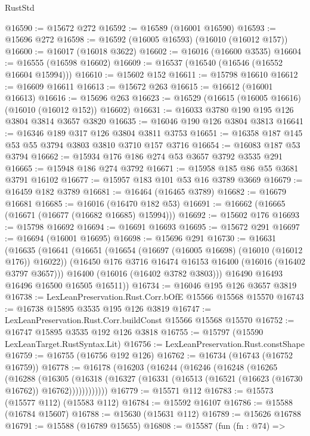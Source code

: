 \begin{lexlean}{RustStd}
\begin{coremodule}
@16590 := @15672 @272
@16592 := @16589 (@16001 @16590)
@16593 := @15696 @272
@16598 := @16592 (@16005 @16593) (@16010 (@16012 @157))
@16600 := @16017 (@16018 @3622)
@16602 := @16016 (@16600 @3535)
@16604 := @16555 (@16598 @16602)
@16609 := @16537 (@16540 (@16546 (@16552 @16604 @15994)))
@16610 := @15602 @152
@16611 := @15798 @16610
@16612 := @16609 @16611
@16613 := @15672 @263
@16615 := @16612 (@16001 @16613)
@16616 := @15696 @263
@16623 := @16529 (@16615 (@16005 @16616) (@16010 (@16012 @152)) @16602)
@16631 := @16033 @3780 @190 @195 @126 @3804 @3814 @3657 @3820
@16635 := @16046 @190 @126 @3804 @3813
@16641 := @16346 @189 @317 @126 @3804 @3811 @3753
@16651 := @16358 @187 @145 @53 @55 @3794 @3803 @3810 @3710 @157 @3716
@16654 := @16083 @187 @53 @3794
@16662 := @15934 @176 @186 @274 @53 @3657 @3792 @3535 @291
@16665 := @15948 @186 @274 @3792
@16671 := @15958 @185 @86 @55 @3681 @3791 @16102
@16677 := @15957 @183 @101 @53 @16 @3789 @3669
@16679 := @16459 @182 @3789
@16681 := @16464 (@16465 @3789)
@16682 := @16679 @16681
@16685 := @16016 (@16470 @182 @53)
@16691 := @16662 (@16665 (@16671 (@16677 (@16682 @16685) @15994)))
@16692 := @15602 @176
@16693 := @15798 @16692
@16694 := @16691 @16693
@16695 := @15672 @291
@16697 := @16694 (@16001 @16695)
@16698 := @15696 @291
@16730 := @16631
    (@16635
      (@16641
        (@16651
          (@16654 (@16697 (@16005 @16698) (@16010 (@16012 @176)) @16022))
          (@16450 @176 @3716 @16474 @16153 @16400 (@16016 (@16402 @3797 @3657)))
          @16400
          (@16016 (@16402 @3782 @3803)))
        @16490
        @16493
        @16496
        @16500
        @16505
        @16511))
@16734 := @16046 @195 @126 @3657 @3819
@16738 := LexLeanPreservation.Rust.Corr.bOfE @15566 @15568 @15570
@16743 := @16738 @15895 @3535 @195 @126 @3819
@16747 := LexLeanPreservation.Rust.Corr.buildConst @15566 @15568 @15570
@16752 := @16747 @15895 @3535 @192 @126 @3818
@16755 := @15797 (@15590 LexLeanTarget.RustSyntax.Lit)
@16756 := LexLeanPreservation.Rust.constShape
@16759 := @16755 (@16756 @192 @126)
@16762 := @16734 (@16743 (@16752 @16759))
@16778 := @16178
    (@16203
      (@16244
        (@16246
          (@16248
            (@16265
              (@16288
                (@16305
                  (@16318
                    (@16327 (@16331 (@16513 (@16521 (@16623 (@16730 @16762)) @16762))))))))))))
@16779 := @15571 @112
@16783 := @15573 (@15577 @112) (@15583 @112)
@16784 := @15592 @16107
@16786 := @15588 (@16784 @15607)
@16788 := @15630 (@15631 @112)
@16789 := @15626 @16788
@16791 := @15588 (@16789 @15655)
@16808 := @15587
    (fun (fn : @74) =>

\end{coremodule}
\end{lexlean}
